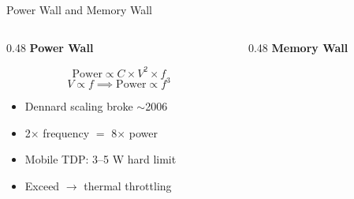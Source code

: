 \documentclass[aspectratio=169, 12pt]{beamer}
\begin{document}
\begin{frame}{Power Wall and Memory Wall}
\note{
%
%
%
%
}

\footnotesize
\begin{columns}[T]
  \begin{column}{0.48\textwidth}
    \textcolor{errorstroke}{\textbf{Power Wall}}

    \vspace{0.1cm}
    $$\text{Power} \propto C \times V^2 \times f$$
    $$V \propto f \implies \text{Power} \propto f^3$$

    \vspace{0.1cm}
    \begin{itemize}\setlength\itemsep{1pt}
      \item Dennard scaling broke $\sim$2006
      \item 2$\times$ frequency $=$ 8$\times$ power
      \item Mobile TDP: 3--5 W hard limit
      \item Exceed $\to$ thermal throttling
    \end{itemize}

    \vspace{0.05cm}
  \end{column}
  \begin{column}{0.48\textwidth}
    \textcolor{datastroke}{\textbf{Memory Wall}}


\end{column}
\end{columns}
\end{frame}
\end{document}
